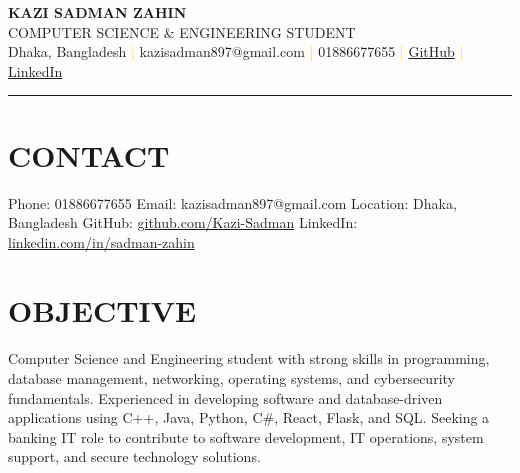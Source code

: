 \documentclass[9pt]{article}
\begin{document}
\begin{center}
  {\fontsize{22}{24}\selectfont\bfseries\color{darktext} KAZI SADMAN ZAHIN}\\[2pt]
  {\large\color{graytext} COMPUTER SCIENCE \& ENGINEERING STUDENT}\\[6pt]
  {\small Dhaka, Bangladesh \textcolor{gold}{|} kazisadman897@gmail.com \textcolor{gold}{|} 01886677655 \textcolor{gold}{|} \href{https://github.com/Kazi-Sadman/}{GitHub} \textcolor{gold}{|} \href{https://www.linkedin.com/in/sadman-zahin-2777143bb/}{LinkedIn}}
\end{center}
\vspace{-8pt}
\color{gold}\hrule
\color{black}

\section*{CONTACT}
Phone: 01886677655 \quad Email: kazisadman897@gmail.com \quad Location: Dhaka, Bangladesh \quad GitHub: \href{https://github.com/Kazi-Sadman/}{github.com/Kazi-Sadman} \quad LinkedIn: \href{https://www.linkedin.com/in/sadman-zahin-2777143bb/}{linkedin.com/in/sadman-zahin}

\section*{OBJECTIVE}
Computer Science and Engineering student with strong skills in programming, database management, networking, operating systems, and cybersecurity fundamentals. Experienced in developing software and database-driven applications using C++, Java, Python, C\#, React, Flask, and SQL. Seeking a banking IT role to contribute to software development, IT operations, system support, and secure technology solutions.

\end{document}
